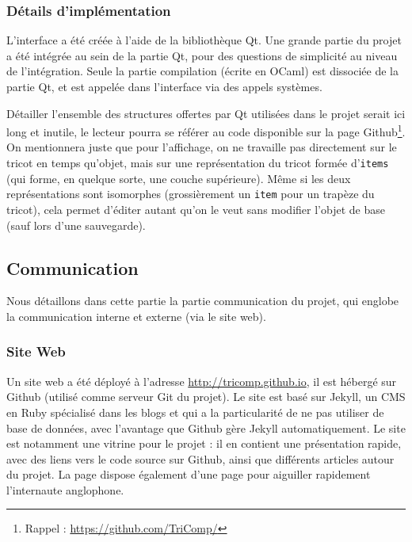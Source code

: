 \documentclass{article}
\begin{document}


\subsubsection{Détails d'implémentation}

L'interface a été créée à l'aide de la bibliothèque Qt. Une grande
partie du projet a été intégrée au sein de la partie Qt, pour des
questions de simplicité au niveau de l'intégration. Seule la partie
compilation (écrite en OCaml) est dissociée de la partie Qt, et est
appelée dans l'interface via des appels systèmes.

Détailler l'ensemble des structures offertes par Qt utilisées dans le projet
serait ici long et inutile, le lecteur pourra se référer au code
disponible sur la page Github\footnote{Rappel :
  \url{https://github.com/TriComp/}}. On mentionnera juste que pour
l'affichage, on ne travaille pas directement sur le tricot en temps
qu'objet, mais sur une représentation du tricot formée
d'\texttt{items} (qui forme, en quelque sorte, une couche
supérieure). Même si les deux représentations sont isomorphes
(grossièrement un \texttt{item} pour un trapèze du tricot), cela
permet d'éditer autant qu'on le veut sans modifier l'objet de base
(sauf lors d'une sauvegarde).

\subsection{Communication}

Nous détaillons dans cette partie la partie communication du projet,
qui englobe la communication interne et externe (via le site web).

\subsubsection{Site Web}

Un site web a été déployé à l'adresse \url{http://tricomp.github.io}, il est hébergé
sur Github (utilisé comme serveur Git du projet). Le site est basé sur Jekyll, un 
CMS en Ruby spécialisé dans les blogs et qui a la particularité de ne pas utiliser 
de base de données, avec l'avantage que Github gère Jekyll automatiquement. Le site 
est notamment une vitrine pour le projet : il en contient une présentation rapide, 
avec des liens vers le code source sur Github, ainsi que différents articles autour du projet.
La page dispose également d'une page pour aiguiller rapidement l'internaute anglophone.
\end{document}
